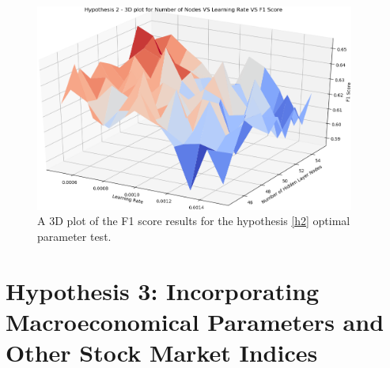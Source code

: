 \documentclass{UoYCSproject}
\begin{document}
\begin{figure}[h]
\includegraphics[width=10.5cm]{h2_f1.png}
\centering
\caption{A 3D plot of the F1 score results for the hypothesis \ref{h2} optimal parameter test.} 
\label{fig:h2_plot_f1}
\end{figure}




\section{Hypothesis 3: Incorporating Macroeconomical Parameters and Other Stock Market Indices}
\end{document}
